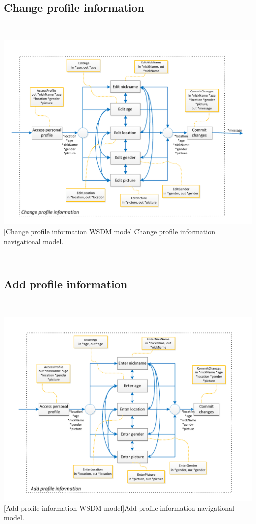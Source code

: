 \documentclass[11pt, a4paper,svglistings,oneside]{book}
\begin{document}
\subsection{Change profile information}

$\;$ \\
\noindent\begin{minipage}{\textwidth}
    \centering
   \includegraphics[scale=1]{Nav_ChangeProfileInformation.pdf}
 [Change profile information WSDM model]{Change profile information navigational model.}
\end{minipage}
$\;$ \\ 

\subsection{Add profile information}

$\;$ \\
\noindent\begin{minipage}{\textwidth}
    \centering
   \includegraphics[scale=1]{nav_AddProfileInformation.pdf}
 [Add profile information WSDM model]{Add profile information navigational model.}
\end{minipage}
$\;$ \\ 
\end{document}
